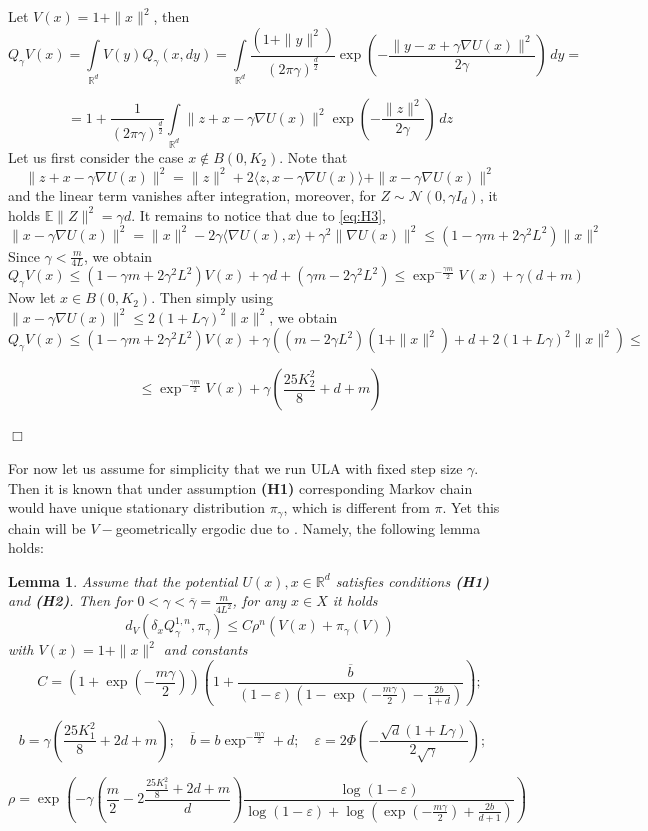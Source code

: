 \documentclass[bj]{imsart}
\def\rset{\mathbb{R}}
\def\rset{\mathbb{R}}
\newcommand{\proofendsign}{$\Box$}
\newtheorem{lem}[thm]{Lemma}
\newenvironment{proof}{{\noindent \bf Proof }}
 {{\hspace*{\fill}\proofendsign\par\bigskip}}
\begin{document}
\begin{proof} Let $V(x) = 1 + \|x\|^2$, then
$$
Q_{\gamma}V(x) = \int\limits_{\rset^d}V(y)Q_{\gamma}(x,dy) = \int\limits_{\rset^d}\frac{(1+\|y\|^2)}{(2\pi\gamma)^{\frac{d}{2}}}\exp{\left(-\frac{\|y-x+\gamma\nabla U(x)\|^2}{2\gamma}\right)}\,dy =
$$

$$
=1 + \frac{1}{(2\pi\gamma)^{\frac{d}{2}}}\int\limits_{\mathbb{R}^d}\|z + x - \gamma \nabla U(x)\|^2 \exp{\left(-\frac{\|z\|^2}{2\gamma}\right)}\,dz
$$
Let us first consider the case $x \notin B(0,K_2)$. Note that
$$
\|z+x-\gamma \nabla U(x)\|^2 = \|z\|^2 + 2 \langle z, x - \gamma \nabla U(x) \rangle + \|x - \gamma \nabla U(x)\|^2
$$
and the linear term vanishes after integration, moreover, for $Z \sim \mathcal{N}(0,\gamma I_d)$, it holds $\mathbb{E}\|Z\|^2 = \gamma d$. It remains to notice that due to \eqref{eq:H3},
\[
\|x - \gamma \nabla U(x) \|^2 = \|x\|^2 - 2\gamma \langle \nabla U(x), x\rangle + \gamma^2 \|\nabla U(x)\|^2 \leq \left(1 - \gamma m + 2\gamma^2 L^2\right)\|x\|^2
\]
Since $\gamma < \frac{m}{4L}$, we obtain
$$
Q_{\gamma}V(x) \leq (1-\gamma m + 2\gamma^2 L^2)V(x) + \gamma d + (\gamma m - 2\gamma^2 L^2) \leq \exp^{-\frac{\gamma m}{2}}V(x) + \gamma (d + m)
$$
Now let $x \in B(0,K_2)$. Then simply using $\|x-\gamma \nabla U(x)\|^2 \leq 2(1+L\gamma)^2\|x\|^2$, we obtain
$$
Q_{\gamma}V(x) \leq (1-\gamma m + 2\gamma^2 L^2)V(x) + \gamma\left((m - 2\gamma L^2)(1+\|x\|^2) + d + 2(1+L\gamma)^2\|x\|^2\right) \leq
$$

$$
\leq \exp^{-\frac{\gamma m}{2}}V(x) + \gamma(\frac{25K_2^2}{8} + d + m)
$$
\end{proof}

For now let us assume for simplicity that we run ULA with fixed step size $\gamma$. Then it is known that under assumption {\bf (H1)} corresponding Markov chain would have unique stationary distribution $\pi_\gamma$, which is different from $\pi$. Yet this chain will be $V-$geometrically ergodic due to \cite[Theorem~19.4.1]{douc:moulines:priouret:soulier:2018}. Namely, the following lemma holds:

\begin{lem}
\label{lem:v_ergodicity}
 Assume that the potential $U(x), x \in \mathbb{R}^d$ satisfies conditions {\bf (H1)} and {\bf (H2)}. Then for $0 < \gamma < \overline{\gamma}=\frac{m}{4L^2}$, for any $x \in X$ it holds
$$
d_V(\delta_xQ_{\gamma}^{1,n},\pi_\gamma) \leq C\rho^n\left(V(x) + \pi_\gamma(V)\right)
$$
with $V(x) = 1 + \|x\|^2$ and constants
$$
C = \left(1 + \exp{\left(-\frac{m\gamma}{2}\right)}\right)\left(1+\frac{\overline{b}}{(1-\varepsilon)(1-\exp{\left(-\frac{m\gamma}{2}\right)} - \frac{2b}{1+d})}\right);
$$

$$
b = \gamma(\frac{25K_1^2}{8} + 2d + m); \quad \overline{b} = b\exp^{-\frac{m\gamma}{2}} + d; \quad \varepsilon = 2\Phi\left(-\frac{\sqrt{d}(1+L\gamma)}{2\sqrt{\gamma}}\right); \quad
$$

$$
\rho = \exp{\left(-\gamma\left(\frac{m}{2} - 2\frac{\frac{25K_1^2}{8} + 2d + m}{d}\right)\frac{\log{(1-\varepsilon)}}{\log{(1-\varepsilon)} + \log{(\exp{\left(-\frac{m\gamma}{2}\right)} + \frac{2b}{d+1})}}\right)}
$$
\end{lem}
\end{document}
